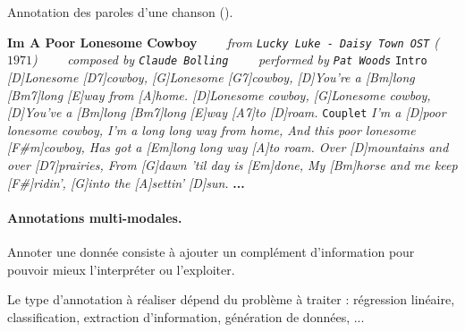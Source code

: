 				
				\begin{leftBarExamples}
					
					Annotation des paroles d'une chanson (\cite{woods:1971:poor-lonesome-cowboy}). \\
					
					\begin{guitar}
						\textbf{Im A Poor Lonesome Cowboy}
						\textit{
							~~~~from \texttt{Lucky Luke - Daisy Town OST} ($1971$)
							~~~~composed by \texttt{Claude Bolling}
							~~~~performed by \texttt{Pat Woods}
						}
						\texttt{Intro}
						\textit{
							[D]Lonesome [D7]cowboy, [G]Lonesome [G7]cowboy, [D]You're a [Bm]long [Bm7]long [E]way from [A]home.
							[D]Lonesome cowboy, [G]Lonesome cowboy, [D]You've a [Bm]long [Bm7]long [E]way [A7]to [D]roam.
						}
						\texttt{Couplet}
						\textit{
							I'm a [D]poor lonesome cowboy, I'm a long long way from home,
							And this poor lonesome [F\#m]cowboy, Has got a [Em]long long way [A]to roam.
							Over [D]mountains and over [D7]prairies, From [G]dawn 'til day is [Em]done,
							My [Bm]horse and me keep [F\#]ridin', [G]into the [A]settin' [D]sun.
						}
						{ \center \textbf{...} }
					\end{guitar}
				\end{leftBarExamples}
				
			
			\paragraph{Annotations multi-modales.}
		
		
		\begin{leftBarSummary}
			\begin{todolist}
				\item[\itemok] Annoter une donnée consiste à ajouter un complément d'information pour pouvoir mieux l'interpréter ou l'exploiter.
				\item[\itemok] Le type d'annotation à réaliser dépend du problème à traiter : régression linéaire, classification, extraction d'information, génération de données, ...
			\end{todolist}
		\end{leftBarSummary}
	
